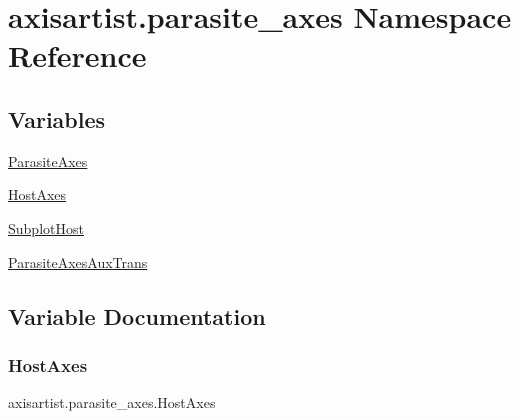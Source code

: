 \hypertarget{namespaceaxisartist_1_1parasite__axes}{}\section{axisartist.\+parasite\+\_\+axes Namespace Reference}
\label{namespaceaxisartist_1_1parasite__axes}
\subsection*{Variables}
\begin{DoxyCompactItemize}
\item 
\hyperlink{namespaceaxisartist_1_1parasite__axes_a288fd1bcdcb34a8b3eb6c06e0d3abd31}{Parasite\+Axes}
\item 
\hyperlink{namespaceaxisartist_1_1parasite__axes_a4a1e17fc6eea7df95a8e357c88f4b926}{Host\+Axes}
\item 
\hyperlink{namespaceaxisartist_1_1parasite__axes_a5e6a315635dccc8d3d8812ed7525f6fc}{Subplot\+Host}
\item 
\hyperlink{namespaceaxisartist_1_1parasite__axes_a0cf41d5d1774c2a8aa66de5f4785bb16}{Parasite\+Axes\+Aux\+Trans}
\end{DoxyCompactItemize}


\subsection{Variable Documentation}
\mbox{\label{namespaceaxisartist_1_1parasite__axes_a4a1e17fc6eea7df95a8e357c88f4b926}} 
\subsubsection{\texorpdfstring{Host\+Axes}{HostAxes}}
{\footnotesize\ttfamily axisartist.\+parasite\+\_\+axes.\+Host\+Axes}

\mbox{\label{namespaceaxisartist_1_1parasite__axes_a288fd1bcdcb34a8b3eb6c06e0d3abd31}} 
